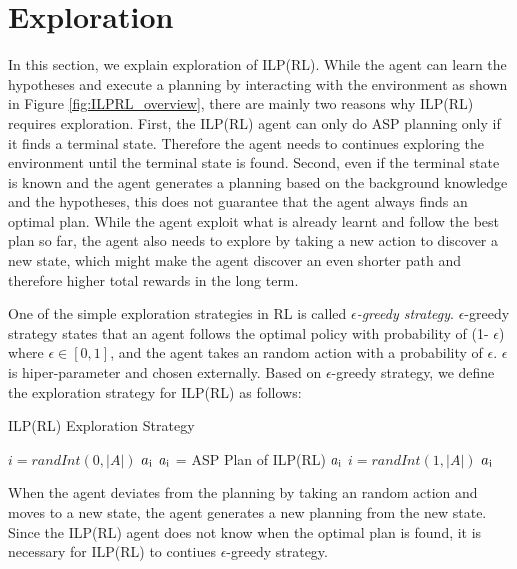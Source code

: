 
\section{Exploration}
\label{exploration}
In this section, we explain exploration of ILP(RL). While the agent can learn the hypotheses and execute a planning by interacting with the environment as shown in Figure \ref{fig:ILPRL_overview},
there are mainly two reasons why ILP(RL) requires exploration. 
First, the ILP(RL) agent can only do ASP planning only if it finds a terminal state. 
Therefore the agent needs to continues exploring the environment until the terminal state is found. 
Second, even if the terminal state is known and the agent generates a planning based on the background knowledge and the hypotheses, 
this does not guarantee that the agent always finds an optimal plan.
While the agent exploit what is already learnt and follow the best plan so far,
the agent also needs to explore by taking a new action to discover a new state, which might make the agent discover an even shorter path and therefore higher total rewards in the long term.

One of the simple exploration strategies in RL is called \textit{$\epsilon$-greedy strategy}.
$\epsilon$-greedy strategy states that an agent follows the optimal policy with probability of (1- $\epsilon$) where $\epsilon \in [0,1]$, 
and the agent takes an random action with a probability of $\epsilon$. $\epsilon$ is hiper-parameter and chosen externally.
Based on $\epsilon$-greedy strategy, we define the exploration strategy for ILP(RL) as follows:
\begin{algorithm}
\caption{ILP(RL) Exploration Strategy}\label{euclid}
\begin{algorithmic}[1]
\State
{}
\space
\State
{}
\State $i = randInt(0, |A|)$ 
\Return $a\textsubscript{i}$
\Else \State $a\textsubscript{i}$ = ASP Plan of ILP(RL)
\Return $a\textsubscript{i}$
\EndIf
\Else \State $i = randInt(1, |A|)$
\Return $a\textsubscript{i}$
\EndIf
\EndProcedure
\end{algorithmic}
\end{algorithm}
When the agent deviates from the planning by taking an random action and moves to a new state, the agent generates a new planning from the new state. 
Since the ILP(RL) agent does not know when the optimal plan is found, it is necessary for ILP(RL) to contiues $\epsilon$-greedy strategy.

